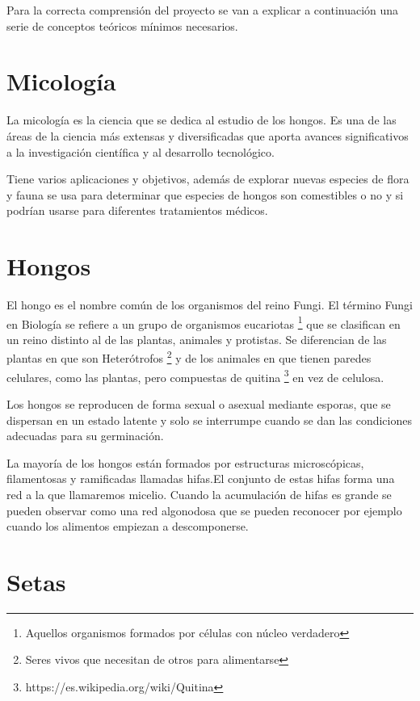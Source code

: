 
Para la correcta comprensión del proyecto se van a explicar a continuación una serie de conceptos teóricos mínimos necesarios.

\section{Micología}

La micología es la ciencia que se dedica al estudio de los hongos. Es una de las áreas de la ciencia más extensas y diversificadas que aporta avances significativos a la investigación científica y al desarrollo tecnológico. \cite{wiki:micologia}

Tiene varios aplicaciones y objetivos, además de explorar nuevas especies de flora y fauna se usa para determinar que especies de hongos son comestibles o no y si podrían usarse para diferentes tratamientos médicos.

\section{Hongos}

El hongo es el nombre común de los organismos del reino Fungi. El término Fungi en Biología se refiere a un grupo de organismos eucariotas \footnote{Aquellos organismos formados por células con núcleo verdadero} que se clasifican en un reino distinto al de las plantas, animales y protistas. Se diferencian de las plantas en que son Heterótrofos \footnote{Seres vivos que necesitan de otros para alimentarse} y de los animales en que tienen paredes celulares, como las plantas, pero compuestas de quitina \footnote{https://es.wikipedia.org/wiki/Quitina} en vez de celulosa.

Los hongos se reproducen de forma sexual o asexual mediante esporas, que se dispersan en un estado latente y solo se interrumpe cuando se dan las condiciones adecuadas para su germinación. \cite{wiki:fungi}

La mayoría de los hongos están formados por estructuras microscópicas, filamentosas y ramificadas llamadas hifas.El conjunto de estas hifas forma una red a la que llamaremos micelio. Cuando la acumulación de hifas es grande se pueden observar como una red algonodosa que se pueden reconocer por ejemplo cuando los alimentos empiezan a descomponerse. \cite{setas}

\section{Setas}

